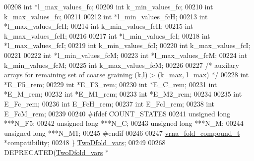 \begin{DoxyCode}
00208   \textcolor{keywordtype}{int}             *l\_max\_values\_fc;
00209   \textcolor{keywordtype}{int}             k\_min\_values\_fc;
00210   \textcolor{keywordtype}{int}             k\_max\_values\_fc;
00211 
00212   \textcolor{keywordtype}{int}             *l\_min\_values\_fcH;
00213   \textcolor{keywordtype}{int}             *l\_max\_values\_fcH;
00214   \textcolor{keywordtype}{int}             k\_min\_values\_fcH;
00215   \textcolor{keywordtype}{int}             k\_max\_values\_fcH;
00216 
00217   \textcolor{keywordtype}{int}             *l\_min\_values\_fcI;
00218   \textcolor{keywordtype}{int}             *l\_max\_values\_fcI;
00219   \textcolor{keywordtype}{int}             k\_min\_values\_fcI;
00220   \textcolor{keywordtype}{int}             k\_max\_values\_fcI;
00221 
00222   \textcolor{keywordtype}{int}             *l\_min\_values\_fcM;
00223   \textcolor{keywordtype}{int}             *l\_max\_values\_fcM;
00224   \textcolor{keywordtype}{int}             k\_min\_values\_fcM;
00225   \textcolor{keywordtype}{int}             k\_max\_values\_fcM;
00226 
00227   \textcolor{comment}{/* auxilary arrays for remaining set of coarse graining (k,l) > (k\_max, l\_max) */}
00228   \textcolor{keywordtype}{int}             *E\_F5\_rem;
00229   \textcolor{keywordtype}{int}             *E\_F3\_rem;
00230   \textcolor{keywordtype}{int}             *E\_C\_rem;
00231   \textcolor{keywordtype}{int}             *E\_M\_rem;
00232   \textcolor{keywordtype}{int}             *E\_M1\_rem;
00233   \textcolor{keywordtype}{int}             *E\_M2\_rem;
00234 
00235   \textcolor{keywordtype}{int}             E\_Fc\_rem;
00236   \textcolor{keywordtype}{int}             E\_FcH\_rem;
00237   \textcolor{keywordtype}{int}             E\_FcI\_rem;
00238   \textcolor{keywordtype}{int}             E\_FcM\_rem;
00239 
00240 \textcolor{preprocessor}{#ifdef COUNT\_STATES}
00241   \textcolor{keywordtype}{unsigned} \textcolor{keywordtype}{long}             ***N\_F5;
00242   \textcolor{keywordtype}{unsigned} \textcolor{keywordtype}{long}             ***N\_C;
00243   \textcolor{keywordtype}{unsigned} \textcolor{keywordtype}{long}             ***N\_M;
00244   \textcolor{keywordtype}{unsigned} \textcolor{keywordtype}{long}             ***N\_M1;
00245 \textcolor{preprocessor}{#endif}
00246 
00247   \hyperlink{group__fold__compound_structvrna__fc__s}{vrna\_fold\_compound\_t} *compatibility;
00248 \} \hyperlink{group__kl__neighborhood__mfe_gaf4f514010a14f9d59d850742b3e96954}{TwoDfold\_vars};
00249 
00268 DEPRECATED(\hyperlink{group__kl__neighborhood__mfe_structTwoDfold__vars}{TwoDfold\_vars} *

\end{DoxyCode}
